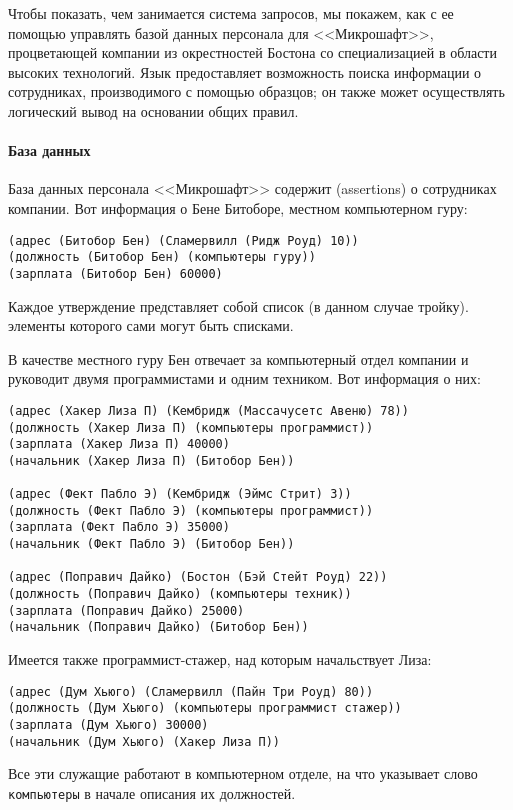 Чтобы показать, чем занимается система запросов, мы
покажем, как с ее помощью управлять базой данных персонала для
<<Микрошафт>>, процветающей
компании из окрестностей Бостона со 
специализацией в области высоких технологий.
Язык предоставляет возможность поиска 
информации о сотрудниках, производимого с помощью образцов; он также
может осуществлять логический вывод на основании общих правил.

\paragraph{База данных}

База данных персонала <<Микрошафт>> содержит 
 (assertions) о сотрудниках компании.
Вот информация о Бене Битоборе, местном компьютерном гуру:

\begin{Verbatim}[fontsize=\small]
(адрес (Битобор Бен) (Сламервилл (Ридж Роуд) 10))
(должность (Битобор Бен) (компьютеры гуру))
(зарплата (Битобор Бен) 60000)
\end{Verbatim}
Каждое утверждение представляет собой список (в данном случае
тройку). элементы которого сами могут быть списками.

В качестве местного гуру Бен отвечает за компьютерный
отдел компании и руководит двумя программистами и одним техником.
Вот информация о них:

\begin{Verbatim}[fontsize=\small]
(адрес (Хакер Лиза П) (Кембридж (Массачусетс Авеню) 78))
(должность (Хакер Лиза П) (компьютеры программист))
(зарплата (Хакер Лиза П) 40000)
(начальник (Хакер Лиза П) (Битобор Бен))

(адрес (Фект Пабло Э) (Кембридж (Эймс Стрит) 3))
(должность (Фект Пабло Э) (компьютеры программист))
(зарплата (Фект Пабло Э) 35000)
(начальник (Фект Пабло Э) (Битобор Бен))

(адрес (Поправич Дайко) (Бостон (Бэй Стейт Роуд) 22))
(должность (Поправич Дайко) (компьютеры техник))
(зарплата (Поправич Дайко) 25000)
(начальник (Поправич Дайко) (Битобор Бен))
\end{Verbatim}
Имеется также программист-стажер, над которым начальствует Лиза:

\begin{Verbatim}[fontsize=\small]
(адрес (Дум Хьюго) (Сламервилл (Пайн Три Роуд) 80))
(должность (Дум Хьюго) (компьютеры программист стажер))
(зарплата (Дум Хьюго) 30000)
(начальник (Дум Хьюго) (Хакер Лиза П))
\end{Verbatim}
Все эти служащие работают в компьютерном отделе, на что указывает
слово {\tt компьютеры} в начале описания их должностей.

